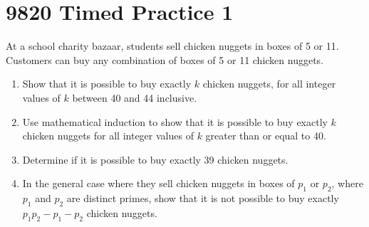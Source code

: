 \section{9820 Timed Practice 1}

\begin{problem}
    At a school charity bazaar, students sell chicken nuggets in boxes of 5 or 11. Customers can buy any combination of boxes of 5 or 11 chicken nuggets.

    \begin{enumerate}
        \item Show that it is possible to buy exactly $k$ chicken nuggets, for all integer values of $k$ between 40 and 44 inclusive.
        \item Use mathematical induction to show that it is possible to buy exactly $k$ chicken nuggets for all integer values of $k$ greater than or equal to 40.
        \item Determine if it is possible to buy exactly 39 chicken nuggets.
        \item In the general case where they sell chicken nuggets in boxes of $p_1$ or $p_2$, where $p_1$ and $p_2$ are distinct primes, show that it is not possible to buy exactly $p_1p_2 - p_1 - p_2$ chicken nuggets.
    \end{enumerate}
\end{problem}
